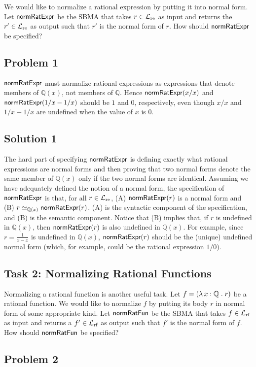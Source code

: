 \documentclass[fleqn]{llncs}
\newcommand{\QQ}{\ensuremath{\mathbb{Q}}}
\newcommand{\NRE}{\ensuremath{\mname{normRatExpr}}}
\newcommand{\NRF}{\ensuremath{\mname{normRatFun}}}
\newcommand{\funQ}[1]{\ensuremath{\LambdaApp x : \QQ \mdot #1}}
\newcommand{\Langre}{\ensuremath{\mathcal{L}}_{\rm re}}
\newcommand{\Langrf}{\ensuremath{\mathcal{L}}_{\rm rf}}
\begin{document}
We would like to normalize a rational expression by putting it into
normal form.  Let $\NRE$ be the SBMA that takes $r \in \Langre$ as
input and returns the $r' \in \Langre$ as output such that $r'$ is the
normal form of $r$.  How should $\NRE$ be specified?

\subsection{Problem 1}

\bsp $\NRE$ must normalize rational expressions as expressions that
denote members of $\QQ(x)$, not members of $\QQ$.  Hence $\NRE(x/x)$
and $\NRE(1/x - 1/x)$ should be $1$ and $0$, respectively, even though
$x/x$ and $1/x - 1/x$ are undefined when the value of $x$ is 0.  \esp

\subsection{Solution 1}

The hard part of specifying $\NRE$ is defining exactly what rational
expressions are normal forms and then proving that two normal forms
denote the same member of $\QQ(x)$ only if the two normal forms are
identical.  Assuming we have adequately defined the notion of a normal
form, the specification of $\NRE$ is that, for all $r \in \Langre$,
(A) $\NRE(r)$ is a normal form and (B) $r \simeq_{\QQ(x)} \NRE(r)$.
(A) is the syntactic component of the specification, and (B) is the
semantic component.  Notice that (B) implies that, if $r$ is undefined
in $\QQ(x)$, then $\NRE(r)$ is also undefined in $\QQ(x)$.  For
example, since $r = \frac{1}{x - x}$ is undefined in $\QQ(x)$,
$\NRE(r)$ should be the (unique) undefined normal form (which, for example,
could be the rational expression $1/0$).

\subsection{Task 2: Normalizing Rational Functions}

Normalizing a rational function is another useful task.  Let $f =
(\funQ{r})$ be a rational function.  We would like to normalize $f$ by
putting its body $r$ in normal form of some appropriate kind.  Let
$\NRF$ be the SBMA that takes $f \in \Langrf$ as input and returns a
$f' \in \Langrf$ as output such that $f'$ is the normal form of $f$.
How should $\NRF$ be specified?

\subsection{Problem 2}
\end{document}

